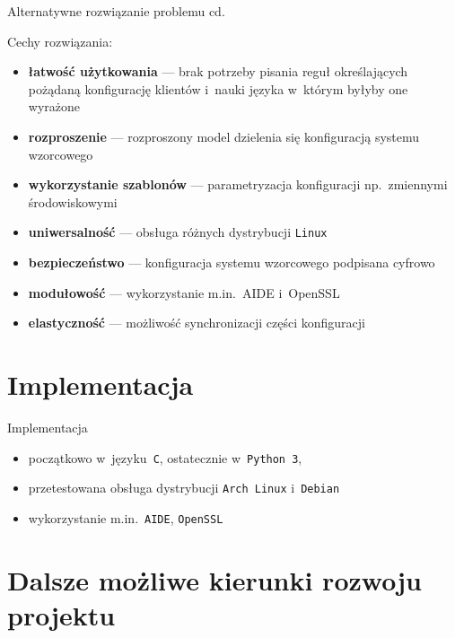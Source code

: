 \documentclass[notes,polish,xcolor=dvipsnames,aspectratio=169]{beamer}
\begin{document}
\begin{frame}{Alternatywne rozwiązanie problemu cd.}

Cechy rozwiązania:
\begin{itemize}
	\item \textbf{łatwość użytkowania} --- brak potrzeby pisania reguł określających pożądaną konfigurację klientów i~nauki języka w~którym byłyby one wyrażone
	\item \textbf{rozproszenie} --- rozproszony model dzielenia się konfiguracją systemu wzorcowego
	\item \textbf{wykorzystanie szablonów} --- parametryzacja konfiguracji np.~zmiennymi środowiskowymi
	\item \textbf{uniwersalność} --- obsługa różnych dystrybucji \texttt{Linux}
	\item \textbf{bezpieczeństwo} --- konfiguracja systemu wzorcowego podpisana cyfrowo
	\item \textbf{modułowość} --- wykorzystanie m.in.~AIDE i~OpenSSL
	\item \textbf{elastyczność} --- możliwość synchronizacji części konfiguracji
\end{itemize}

\end{frame}


\section{Implementacja}

\begin{frame}{Implementacja}

\begin{itemize}
	\item początkowo w~języku~\texttt{C}, ostatecznie w~\texttt{Python~3},
	\item przetestowana obsługa dystrybucji \texttt{Arch Linux} i~\texttt{Debian}
	\item wykorzystanie m.in.~\texttt{AIDE}, \texttt{OpenSSL}
\end{itemize}

\end{frame}


\section{Dalsze możliwe kierunki rozwoju projektu}
\end{document}
